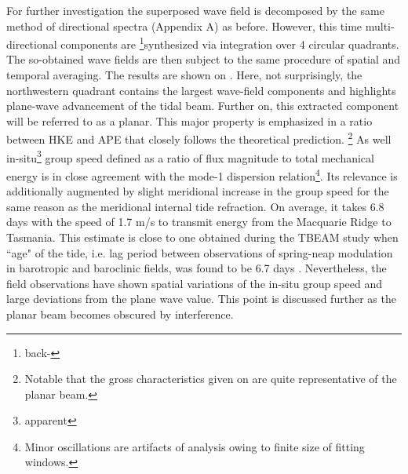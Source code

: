 \documentclass[12pt]{article}
\begin{document}
For further investigation the superposed wave field is decomposed by the same method of 
directional spectra (Appendix A) as before. However, this time multi-directional components are 
\footnote{back-}synthesized via integration over 4 circular quadrants. The so-obtained wave fields 
are then subject to the same procedure of spatial and temporal averaging. The results are shown on 
. Here, not surprisingly, the northwestern quadrant 
 contains the largest wave-field components and highlights plane-wave 
advancement of the tidal beam. Further on, this extracted component will be referred to as a 
planar. This major property is emphasized in a ratio between HKE and APE that closely follows the 
theoretical prediction. \footnote{Notable that the gross characteristics given on 
 are quite representative of the planar beam.} As well 
in-situ\footnote{apparent} group speed defined as a ratio of flux magnitude to total mechanical 
energy is in close agreement with the mode-1 dispersion relation\footnote{Minor oscillations are 
artifacts of analysis owing to finite size of fitting windows. }. Its relevance is additionally 
augmented by slight meridional increase in the group speed for the same reason as the meridional 
internal tide refraction. On average, it takes 6.8 days with the speed of 1.7 m/s to transmit 
energy 
from the 
Macquarie Ridge to Tasmania. This estimate is close to one obtained during the TBEAM study when 
``age" of the tide, i.e. lag period between observations of spring-neap modulation in barotropic 
and baroclinic fields, was found to be 6.7 days \citep{waterhouse2018observations}. Nevertheless, 
the field observations have shown spatial variations of the in-situ group speed and large 
deviations from the plane wave value. This point is discussed further as the planar beam becomes 
obscured by interference.\\
\end{document}

